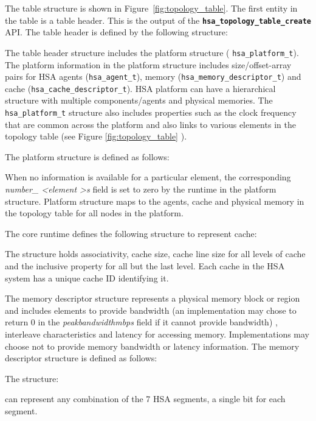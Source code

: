 \documentclass{book}
\newcommand{\diffblock}[1]{#1}
\newcommand{\ttbf}[1]{\diffblock{\texttt{\textbf{#1}}}}
\newcommand{\dbtt}[1]{\diffblock{\texttt{#1}}}
\begin{document}
The table structure is shown in Figure~\ref{fig:topology_table}.
The first entity in the table is a table header. This is the output
of the \ttbf{hsa\_topology\_table\_create} API.
The table header is defined by the following structure:


The table header structure includes the platform structure (
\dbtt{hsa\_platform\_t}).  The platform information in the platform
structure includes size/offset-array pairs for HSA agents
(\dbtt{hsa\_agent\_t}), memory (\dbtt{hsa\_memory\_descriptor\_t}) and
cache (\dbtt{hsa\_cache\_descriptor\_t}).
HSA platform can have a hierarchical structure with multiple
components/agents and physical memories.  The
\dbtt{hsa\_platform\_t} structure also includes properties such as
the clock frequency that are common across the platform and also
links to various elements in the topology table (see Figure
\ref{fig:topology_table} ).

The platform structure is defined as follows:



When no information is available for a particular element, the
corresponding {\itshape number\_ \textless element \textgreater s}
field is set to zero by the runtime in the platform structure.
Platform structure maps to the agents, cache and physical memory
in the topology table for all nodes in the platform.

The core runtime defines the following structure to represent cache:

The structure holds associativity, cache size, cache line size for
all levels of cache and the inclusive property for all but the
last level. Each cache in the HSA system has a unique cache ID
identifying it.

The memory descriptor structure represents a physical memory block or
region and includes elements to provide bandwidth (an implementation
may chose to return 0 in the {\itshape peak\textunderscore bandwidth\textunderscore mbps} field if
it cannot provide bandwidth) , interleave characteristics and latency
for accessing memory. Implementations may choose not to provide memory
bandwidth or latency information.  The memory descriptor structure is
defined as follows:



The structure:

can represent any combination of the 7 HSA segments, a single
bit for each segment.
\end{document}
